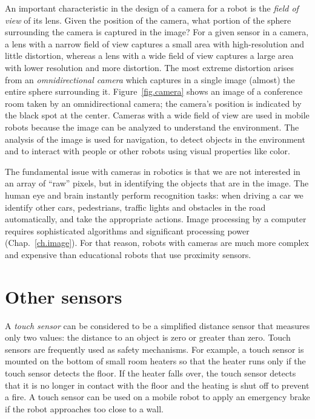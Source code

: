 
An important characteristic in the design of a camera for a robot is the \emph{field of view} of its lens. Given the position of the camera, what portion of the sphere surrounding the camera is captured in the image? For a given sensor in a camera, a lens with a narrow field of view captures a small area with high-resolution and little distortion, whereas a lens with a wide field of view captures a large area with lower resolution and more distortion. The most extreme distortion arises from an \emph{omnidirectional camera} which captures in a single image (almost) the entire sphere surrounding it. Figure~\ref{fig.camera} shows an image of a conference room taken by an omnidirectional camera; the camera's position is indicated by the black spot at the center. Cameras with a wide field of view are used in mobile robots because the image can be analyzed to understand the environment. The analysis of the image is used for navigation, to detect objects in the environment and to interact with people or other robots using visual properties like color.

The fundamental issue with cameras in robotics is that we are not interested in an array of ``raw'' pixels, but in identifying the objects that are in the image. The human eye and brain instantly perform recognition tasks: when driving a car we identify other cars, pedestrians, traffic lights and obstacles in the road automatically, and take the appropriate actions. Image processing by a computer requires sophisticated algorithms and significant processing power (Chap.~\ref{ch.image}). For that reason, robots with cameras are much more complex and expensive than educational robots that use proximity sensors.

\section{Other sensors}\label{s.other-sensors}

A \emph{touch sensor} can be considered to be a simplified distance sensor that measures only two values: the distance to an object is zero or greater than zero. Touch sensors are frequently used as safety mechanisms. For example, a touch sensor is mounted on the bottom of small room heaters so that the heater runs only if the touch sensor detects the floor. If the heater falls over, the touch sensor detects that it is no longer in contact with the floor and the heating is shut off to prevent a fire. A touch sensor can be used on a mobile robot to apply an emergency brake if the robot approaches too close to a wall.

